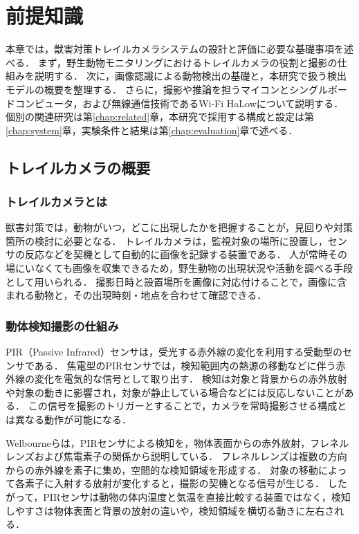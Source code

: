\chapter{前提知識}
\label{chap:background}

本章では，獣害対策トレイルカメラシステムの設計と評価に必要な基礎事項を述べる．
まず，野生動物モニタリングにおけるトレイルカメラの役割と撮影の仕組みを説明する．
次に，画像認識による動物検出の基礎と，本研究で扱う検出モデルの概要を整理する．
さらに，撮影や推論を担うマイコンとシングルボードコンピュータ，および無線通信技術であるWi-Fi HaLowについて説明する．
個別の関連研究は第\ref{chap:related}章，本研究で採用する構成と設定は第\ref{chap:system}章，実験条件と結果は第\ref{chap:evaluation}章で述べる．

\section{トレイルカメラの概要}
\label{sec:background-trail-camera}
\subsection{トレイルカメラとは}
獣害対策では，動物がいつ，どこに出現したかを把握することが，見回りや対策箇所の検討に必要となる．
トレイルカメラは，監視対象の場所に設置し，センサの反応などを契機として自動的に画像を記録する装置である．
人が常時その場にいなくても画像を収集できるため，野生動物の出現状況や活動を調べる手段として用いられる\cite{Beery2019,IEICE2020}．
撮影日時と設置場所を画像に対応付けることで，画像に含まれる動物と，その出現時刻・地点を合わせて確認できる．

\subsection{動体検知撮影の仕組み}
\label{sec:background-capture}
PIR（Passive Infrared）センサは，受光する赤外線の変化を利用する受動型のセンサである．
焦電型のPIRセンサでは，検知範囲内の熱源の移動などに伴う赤外線の変化を電気的な信号として取り出す．
検知は対象と背景からの赤外放射や対象の動きに影響され，対象が静止している場合などには反応しないことがある\cite{Welbourne2016,PanasonicPIR}．
この信号を撮影のトリガーとすることで，カメラを常時撮影させる構成とは異なる動作が可能になる．

Welbourneら\cite{Welbourne2016}は，PIRセンサによる検知を，物体表面からの赤外放射，フレネルレンズおよび焦電素子の関係から説明している．
フレネルレンズは複数の方向からの赤外線を素子に集め，空間的な検知領域を形成する．
対象の移動によって各素子に入射する放射が変化すると，撮影の契機となる信号が生じる．
したがって，PIRセンサは動物の体内温度と気温を直接比較する装置ではなく，検知しやすさは物体表面と背景の放射の違いや，検知領域を横切る動きに左右される．

